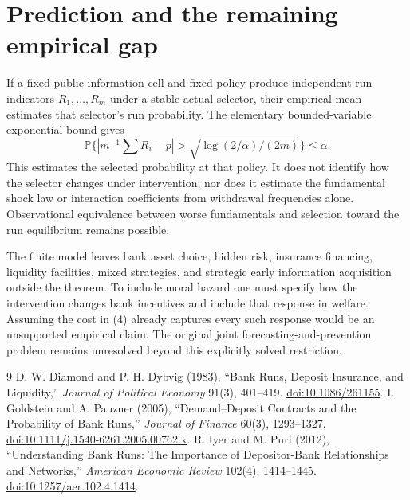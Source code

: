 \documentclass[11pt,a4paper]{article}
\theoremstyle{remark}
\newcommand{\Prob}{\mathbb P}
\begin{document}
\section{Prediction and the remaining empirical gap}
If a fixed public-information cell and fixed policy produce independent run indicators $R_1,\ldots,R_m$ under a stable actual selector, their empirical mean estimates that selector's run probability. The elementary bounded-variable exponential bound gives
\[
 \Prob\{|m^{-1}\sum R_i-p|>\sqrt{\log(2/\alpha)/(2m)}\}\le\alpha.
\]
This estimates the selected probability at that policy. It does not identify how the selector changes under intervention; nor does it estimate the fundamental shock law or interaction coefficients from withdrawal frequencies alone. Observational equivalence between worse fundamentals and selection toward the run equilibrium remains possible.

The finite model leaves bank asset choice, hidden risk, insurance financing, liquidity facilities, mixed strategies, and strategic early information acquisition outside the theorem. To include moral hazard one must specify how the intervention changes bank incentives and include that response in welfare. Assuming the cost in (4) already captures every such response would be an unsupported empirical claim. The original joint forecasting-and-prevention problem remains unresolved beyond this explicitly solved restriction.

\begin{thebibliography}{9}
 D. W. Diamond and P. H. Dybvig (1983), ``Bank Runs, Deposit Insurance, and Liquidity,'' \emph{Journal of Political Economy} 91(3), 401--419. \href{https://doi.org/10.1086/261155}{doi:10.1086/261155}.
 I. Goldstein and A. Pauzner (2005), ``Demand--Deposit Contracts and the Probability of Bank Runs,'' \emph{Journal of Finance} 60(3), 1293--1327. \href{https://doi.org/10.1111/j.1540-6261.2005.00762.x}{doi:10.1111/j.1540-6261.2005.00762.x}.
 R. Iyer and M. Puri (2012), ``Understanding Bank Runs: The Importance of Depositor-Bank Relationships and Networks,'' \emph{American Economic Review} 102(4), 1414--1445. \href{https://doi.org/10.1257/aer.102.4.1414}{doi:10.1257/aer.102.4.1414}.
\end{thebibliography}
\end{document}
